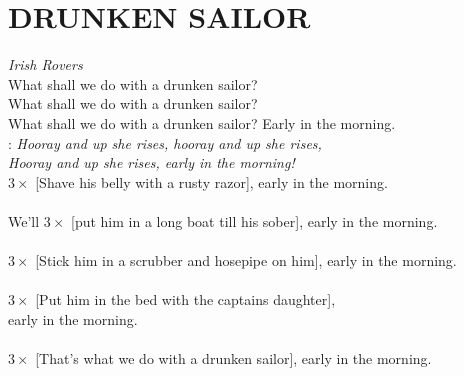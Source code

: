 \section*{\Huge DRUNKEN SAILOR}
\emph{Irish Rovers}\\

What shall we do with a drunken sailor?\\
What shall we do with a drunken sailor?\\
What shall we do with a drunken sailor? Early  in the morning.\\

\textregistered:
\emph{Hooray and up she rises, hooray and up she rises,\\
Hooray and up she rises, early in the morning!}\\

$3\times$ [Shave his belly with a rusty razor], early in the morning.\\

\textregistered\\

We'll $3\times$ [put him in a long boat till his sober], early in the morning.\\

\textregistered\\

$3\times$ [Stick him in a scrubber and hosepipe on him], early in the morning.\\

\textregistered\\

$3\times$ [Put him in the bed with the captains daughter],\\
early in the morning.\\

\textregistered\\

$3\times$ [That’s what we do with a drunken sailor], early in the morning.\\

\textregistered \textregistered

\newpage
